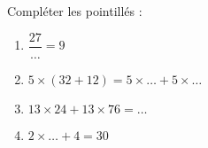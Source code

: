 
\begin{exercice}\label{exo2smath-0064}

    Compléter les pointillés :
    \begin{multicols}{3}
        \begin{enumerate}
            \item
                \( \dfrac{ 27 }{ \ldots }=9\)
            \item
                \( 5\times (32+12)=5\times \ldots+5\times \ldots\)
            \item
                \( 13\times 24+13\times 76=\ldots\)
            \item
                \( 2\times \ldots+4=30\)
        \end{enumerate}
    \end{multicols}

\end{exercice}

